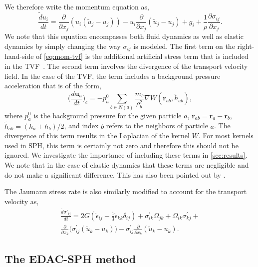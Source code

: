 \documentclass[preprint,12pt]{elsarticle}
\newcommand{\ten}[1]{\ensuremath{\mathbf{#1}}}
\begin{document}
%
We therefore write the momentum equation as,
\begin{equation}
  \label{eq:mom-tvf}
  \frac{\tilde{d} u_i}{d t} =
  \frac{\partial}{\partial x_j} (u_i (\tilde{u}_j - u_j))
  - u_i \frac{\partial}{\partial x_j} (\tilde{u}_j - u_j)
  + g_i
  +\frac{1}{\rho} \frac{\partial \sigma_{ij}}{\partial x_j}.
\end{equation}
We note that this equation encompasses both fluid dynamics as well as elastic
dynamics by simply changing the way $\sigma_{ij}$ is modeled. The first term
on the right-hand-side of \cref{eq:mom-tvf} is the additional artificial
stress term that is included in the TVF~\cite{Adami2013}. The second term
involves the divergence of the transport velocity field. In the case of the
TVF, the term includes a background pressure acceleration that is of the form,
\begin{equation}
  \label{eq:tvf-accel}
  \bigg(\frac{d \ten{u}_a}{dt}\bigg)_{c} = - p^0_a \sum_{b \in N(a)}
  \frac{m_b}{\rho_b^2} \nabla W(\ten{r}_{ab}, \tilde{h}_{ab}),
\end{equation}
where $p^0_a$ is the background pressure for the given particle $a$,
$\ten{r}_{ab} = \ten{r}_a - \ten{r}_b$, $\tilde{h}_{ab} = (h_a + h_b)/2$, and
index $b$ refers to the neighbors of particle $a$. The divergence of this term
results in the Laplacian of the kernel $W$. For most kernels used in SPH, this
term is certainly not zero and therefore this should not be ignored. We
investigate the importance of including these terms in \cref{sec:results}. We
note that in the case of elastic dynamics that these terms are negligible and
do not make a significant difference. This has also been pointed out by
\citet{zhang_hu_adams17}.

The Jaumann stress rate is also similarly modified to account for the
transport velocity as,
\begin{multline}
  \label{eq:modified-jaumann-stress-rate}
  \frac{\tilde{d} \sigma'_{ij}}{dt} = 2G (\dot{\epsilon}_{ij} - \frac{1}{3}
  \dot{\epsilon}_{kk} \delta_{ij}) + \sigma^{'}_{ik}  \Omega_{jk} +
  \Omega_{ik} \sigma^{'}_{kj} + \\
  \frac{\partial}{\partial x_k}\big(\sigma^{'}_{ij}  (\tilde{u}_k - u_k)\big)
  - \sigma^{'}_{ij} \frac{\partial}{\partial x_k} (\tilde{u}_k - u_k).
\end{multline}


\subsection{The EDAC-SPH method}
\label{sec:edac-tvf}
\end{document}
